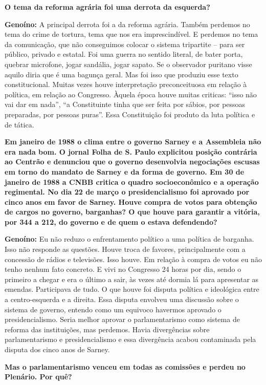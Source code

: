 \textbf{O tema da reforma agrária foi uma derrota da esquerda?}

\textbf{Genoíno:} A principal derrota foi a da reforma agrária. Também
perdemos no tema do crime de tortura, tema que nos era imprescindível. E
perdemos no tema da comunicação, que não conseguimos colocar o sistema
tripartite -- para ser público, privado e estatal. Foi uma guerra no
sentido literal, de bater porta, quebrar microfone, jogar sandália,
jogar sapato. Se o observador puritano visse aquilo diria que é uma
bagunça geral. Mas foi isso que produziu esse texto constitucional.
Muitas vezes houve interpretação preconceituosa em relação à política,
em relação ao Congresso. Àquela época houve muitas criticas: ``isso não
vai dar em nada'', ``a Constituinte tinha que ser feita por sábios, por
pessoas preparadas, por pessoas puras''. Essa Constituição foi produto
da luta política e de tática.

\textbf{Em janeiro de 1988 o clima entre o governo Sarney e a Assembleia
não era nada bom. O jornal Folha de S. Paulo explicitou posição
contrária ao Centrão e denunciou que o governo desenvolvia negociações
escusas em torno do mandato de Sarney e da forma de governo. Em 30 de
janeiro de 1988 a CNBB critica o quadro socioeconômico e a operação
regimental. No dia 22 de março o presidencialismo foi aprovado por cinco
anos em favor de Sarney. Houve compra de votos para obtenção de cargos
no governo, barganhas? O que houve para garantir a vitória, por 344 a
212, do governo e de quem o estava defendendo?}

\textbf{Genoíno:} Eu não reduzo o enfrentamento político a uma política
de barganha. Isso não responde as questões. Houve troca de favores,
principalmente com a concessão de rádios e televisões. Isso houve. Em
relação à compra de votos eu não tenho nenhum fato concreto. E vivi no
Congresso 24 horas por dia, sendo o primeiro a chegar e era o último a
sair, às vezes até dormia lá para apresentar as emendas. Participava de
tudo. O que houve foi disputa política e ideológica entre a
centro-esquerda e a direita. Essa disputa envolveu uma discussão sobre o
sistema de governo, entendo como um equivoco havermos aprovado o
presidencialismo. Seria melhor aprovar o parlamentarismo como sistema de
reforma das instituições, mas perdemos. Havia divergências sobre
parlamentarismo e presidencialismo e essa divergência acabou contaminada
pela disputa dos cinco anos de Sarney.

\textbf{Mas o parlamentarismo venceu em todas as comissões e perdeu no
Plenário. Por quê?}

